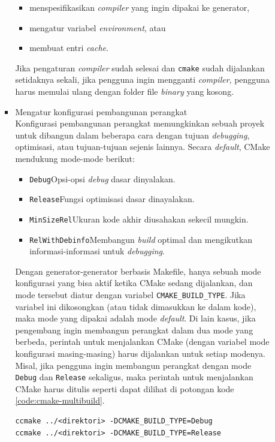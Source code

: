 \documentclass[a4paper,twoside]{article}
\begin{document}
\begin{enumerate}
\begin{enumerate}
\begin{itemize}
		\begin{itemize}
			\item menspesifikasikan \textit{compiler} yang ingin dipakai ke generator,
			\item mengatur variabel \textit{environment}, atau
			\item membuat entri \textit{cache}.
		\end{itemize}
		
		Jika pengaturan \textit{compiler} sudah selesai dan \verb|cmake| sudah dijalankan setidaknya sekali, jika pengguna ingin mengganti \textit{compiler}, pengguna harus memulai ulang dengan folder file \textit{binary} yang kosong.
		\item Mengatur konfigurasi pembangunan perangkat\\
		Konfigurasi pembangunan perangkat memungkinkan sebuah proyek untuk dibangun dalam beberapa cara dengan tujuan \textit{debugging}, optimisasi, atau tujuan-tujuan sejenis lainnya. Secara \textit{default}, CMake mendukung mode-mode berikut:
		
		\begin{itemize}
			\item \verb|Debug|\textemdash Opsi-opsi \textit{debug} dasar dinyalakan.
			\item \verb|Release|\textemdash Fungsi optimisasi dasar dinayalakan.
			\item \verb|MinSizeRel|\textemdash Ukuran kode akhir diusahakan sekecil mungkin.
			\item \verb|RelWithDebinfo|\textemdash Membangun \textit{build} optimal dan mengikutkan informasi-informasi untuk \textit{debugging}.
		\end{itemize}
		
		Dengan generator-generator berbasis Makefile, hanya sebuah mode konfigurasi yang bisa aktif ketika CMake sedang dijalankan, dan mode tersebut diatur dengan variabel \verb|CMAKE_BUILD_TYPE|. Jika variabel ini dikosongkan (atau tidak dimasukkan ke dalam kode), maka mode yang dipakai adalah mode \textit{default}. Di lain kasus, jika pengembang ingin membangun perangkat dalam dua mode yang berbeda, perintah untuk menjalankan CMake (dengan variabel mode konfigurasi masing-masing) harus dijalankan untuk setiap modenya. 
		Misal, jika pengguna ingin membangun perangkat dengan mode \verb|Debug| dan \verb|Release| sekaligus, maka perintah untuk menjalankan CMake harus ditulis seperti dapat dilihat di potongan kode \ref{code:cmake-multibuild}.
		
		\begin{lstlisting}[caption=Kode utama operasional CMakeLists, label=code:cmake-multibuild]
ccmake ../<direktori> -DCMAKE_BUILD_TYPE=Debug
ccmake ../<direktori> -DCMAKE_BUILD_TYPE=Release
		\end{lstlisting}
		

\end{itemize}
\end{enumerate}
\end{enumerate}
\end{document}
